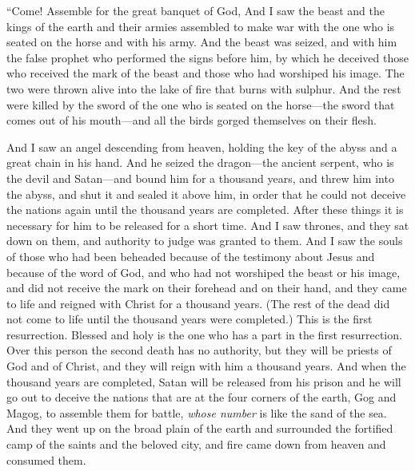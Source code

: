 \begin{biblechapter}
\verse “Come! Assemble for the great banquet of God,
\verse And I saw the beast and the kings of the earth and their armies assembled to make war with the one who is seated on the horse and with his army.
\verse And the beast was seized, and with him the false prophet who performed the signs before him, by which he deceived those who received the mark of the beast and those who had worshiped his image. The two were thrown alive into the lake of fire that burns with sulphur.
\verse And the rest were killed by the sword of the one who is seated on the horse—the sword that comes out of his mouth—and all the birds gorged themselves on their flesh.
\end{biblechapter}

\begin{biblechapter} %
 And I saw an angel descending from heaven, holding the key of the abyss and a great chain in his hand.
\verse And he seized the dragon—the ancient serpent, who is the devil and Satan—and bound him for a thousand years,
\verse and threw him into the abyss, and shut it and sealed it above him, in order that he could not deceive the nations again until the thousand years are completed. After these things it is necessary for him to be released for a short time.
\verse And I saw thrones, and they sat down on them, and authority to judge was granted to them. And I saw the souls of those who had been beheaded because of the testimony about Jesus and because of the word of God, and who had not worshiped the beast or his image, and did not receive the mark on their forehead and on their hand, and they came to life and reigned with Christ for a thousand years.
\verse (The rest of the dead did not come to life until the thousand years were completed.) This is the first resurrection.
\verse Blessed and holy is the one who has a part in the first resurrection. Over this person the second death has no authority, but they will be priests of God and of Christ, and they will reign with him a thousand years.
 And when the thousand years are completed, Satan will be released from his prison
\verse and he will go out to deceive the nations that are at the four corners of the earth, Gog and Magog, to assemble them for battle, \textit{whose number} is like the sand of the sea.
\verse And they went up on the broad plain of the earth and surrounded the fortified camp of the saints and the beloved city, and fire came down from heaven and consumed them.

\end{biblechapter}
